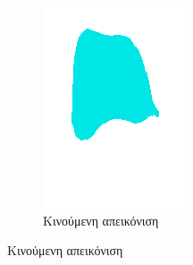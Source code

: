 \documentclass[a4paper,12pt]{article}
\begin{document}
\begin{figure}[H]
\begin{subfigure}[t]{0.4\linewidth}
    \includegraphics[width=\linewidth]{moving_label_after_registration_3.png}
    \caption{Κινούμενη απεικόνιση}
    \end{subfigure}


\end{figure}
\end{document}
